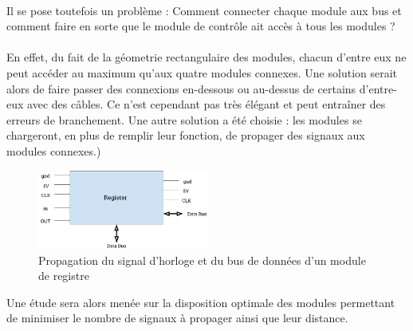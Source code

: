 \documentclass{article}
\begin{document}
    \paragraph{}
    Il se pose toutefois un problème : Comment connecter chaque module aux bus et comment faire en sorte 
    que le module de contrôle ait accès à tous les modules ?
    \paragraph{}
    En effet, du fait de la géometrie rectangulaire
    des modules, chacun d'entre eux ne peut accéder au maximum qu'aux quatre modules connexes.
    Une solution serait alors de faire passer des connexions en-dessous ou au-dessus de certains
    d'entre-eux avec des câbles. Ce n'est cependant pas très élégant et peut entraîner des erreurs
    de branchement.
    Une autre solution a été choisie : les modules se chargeront, en plus de remplir leur fonction,
    de propager des signaux aux modules connexes.)

    \begin{figure}[ht!]
        \label{fig_reg_module}
        \centering
        \includegraphics[width=0.5\textwidth]{figures/Module.png}
        \caption{Propagation du signal d'horloge et du bus de données d'un module de registre}
    \end{figure}

    Une étude sera alors menée sur la disposition optimale des modules permettant de minimiser le nombre
    de signaux à propager ainsi que leur distance.

    \newpage
\end{document}
